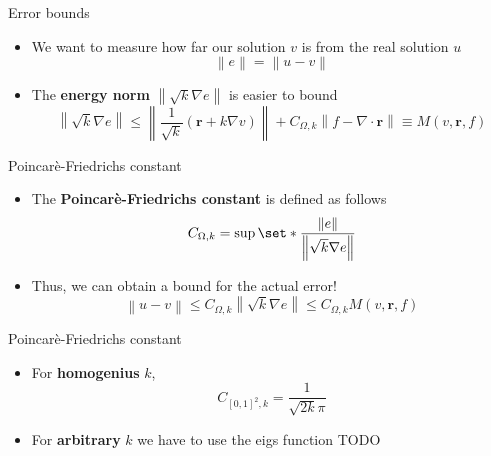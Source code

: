 \documentclass{beamer}
\newcommand{\norm}[1]{\left\lVert#1\right\rVert}
\DeclarePairedDelimiter\set\{\}
\begin{document}
    \begin{frame}{Error bounds}
        \begin{itemize}
            \item We want to measure how far our solution $v$ is from the real solution $u$
            \begin{equation*}
                \norm{e} = \norm{u - v}
            \end{equation*}
            \item The \textbf{energy norm} $\norm{\sqrt{k}\nabla e}$ is easier to bound
            \begin{equation*}
                \norm{\sqrt{k}\nabla e} \leq \norm{\frac{1}{\sqrt{k}} (\bm{r} + k\nabla v)} + C_{\Omega, k} \norm{f - \nabla \cdot \bm{r}} \equiv M(v, \bm{r}, f)
            \end{equation*}
        \end{itemize}
    \end{frame}

    \begin{frame}{Poincarè-Friedrichs constant}
        \begin{itemize}
            \item The \textbf{Poincarè-Friedrichs constant} is defined as follows
            \begin{equation*}
                C_{\Omega, k} = \sup\set*{\frac{\norm{e}}{\norm{\sqrt{k}\nabla e}}}
            \end{equation*}
            \item Thus, we can obtain a bound for the actual error!
            \begin{equation*}
                \norm{u - v} \leq C_{\Omega, k} \norm{\sqrt{k}\nabla e} \leq C_{\Omega, k}M(v, \bm{r}, f)
            \end{equation*}
        \end{itemize}
    \end{frame}

    \begin{frame}{Poincarè-Friedrichs constant}
        \begin{itemize}
            \item For \textbf{homogenius} $k$,
            \begin{equation*}
                C_{[0, 1]^2, k} = \frac{1}{\sqrt{2 k} \pi}    
            \end{equation*}
            \item For \textbf{arbitrary} $k$ we have to use the eigs function TODO
        \end{itemize}
    \end{frame}
\end{document}
